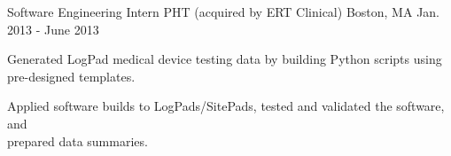 \begin{cventries}
\vspace{5mm}
  \cventry
    {Software Engineering Intern} %
    {PHT (acquired by ERT Clinical)} %
    {Boston, MA} %
    {Jan. 2013 - June 2013} %
    {
      \begin{cvitems} %
        \item {Generated LogPad medical device testing data by building Python scripts using pre-designed templates.}
        \item {Applied software builds to LogPads/SitePads, tested and validated the software, and \\prepared data summaries.}
      \end{cvitems}
    }

\end{cventries}
